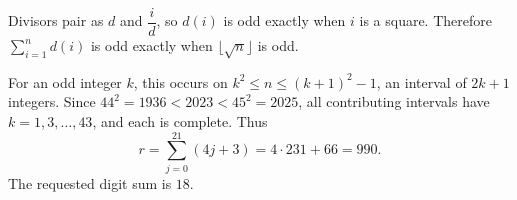 Divisors pair as $d$ and $\dfrac{i}{d}$, so $d(i)$ is odd exactly when $i$ is a square. Therefore $\sum_{i=1}^n d(i)$ is odd exactly when $\lfloor\sqrt n\rfloor$ is odd.

For an odd integer $k$, this occurs on $k^2\le n\le(k+1)^2-1$, an interval of $2k+1$ integers. Since $44^2=1936<2023<45^2=2025$, all contributing intervals have $k=1,3,\ldots,43$, and each is complete. Thus
\[
r=\sum_{j=0}^{21}(4j+3)=4\cdot231+66=990.
\]
The requested digit sum is $\boxed{18}$.
